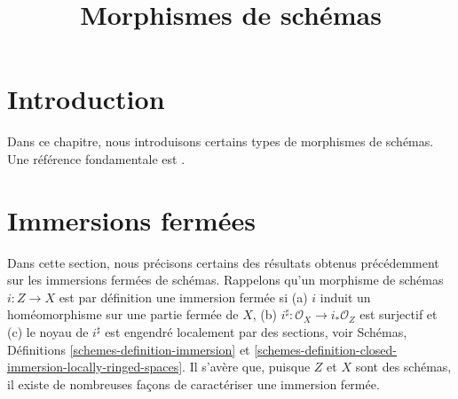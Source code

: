 

%


\title{Morphismes de schémas}


\maketitle

\label{section-phantom}

\tableofcontents

\section{Introduction}
\label{section-introduction}

\noindent
Dans ce chapitre, nous introduisons certains types de morphismes de schémas.
Une référence fondamentale est \cite{EGA}.




















\section{Immersions fermées}
\label{section-closed-immersions}

\noindent
Dans cette section, nous précisons certains des résultats obtenus précédemment sur les
immersions fermées de schémas. Rappelons qu'un morphisme de schémas $i : Z \to X$
est par définition une immersion fermée si (a) $i$ induit un homéomorphisme sur
une partie fermée de $X$, (b) $i^\sharp : \mathcal{O}_X \to i_*\mathcal{O}_Z$
est surjectif et (c) le noyau de $i^\sharp$ est engendré localement par des
sections, voir Schémas, Définitions \ref{schemes-definition-immersion}
et \ref{schemes-definition-closed-immersion-locally-ringed-spaces}. Il s'avère
que, puisque $Z$ et $X$ sont des schémas, il existe de nombreuses
façons de caractériser une immersion fermée.

